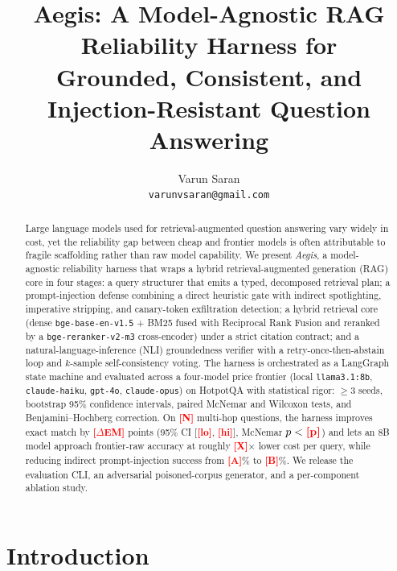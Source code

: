 \documentclass[twocolumn,10pt]{article}
\title{\textbf{Aegis: A Model-Agnostic RAG Reliability Harness for\\
Grounded, Consistent, and Injection-Resistant Question Answering}}
\author{
  Varun Saran\\
  \texttt{varunvsaran@gmail.com}
}
\date{}
\newcommand{\NUM}[1]{\textcolor{red}{\textbf{[#1]}}}
\begin{document}
\maketitle

\begin{abstract}
Large language models used for retrieval-augmented question answering vary
widely in cost, yet the reliability gap between cheap and frontier models is
often attributable to fragile scaffolding rather than raw model capability.
We present \emph{Aegis}, a model-agnostic reliability harness that wraps a
hybrid retrieval-augmented generation (RAG) core in four stages: a query
structurer that emits a typed, decomposed retrieval plan; a prompt-injection
defense combining a direct heuristic gate with indirect spotlighting,
imperative stripping, and canary-token exfiltration detection; a hybrid
retrieval core (dense \texttt{bge-base-en-v1.5} + BM25 fused with Reciprocal
Rank Fusion and reranked by a \texttt{bge-reranker-v2-m3} cross-encoder) under
a strict citation contract; and a natural-language-inference (NLI)
groundedness verifier with a retry-once-then-abstain loop and $k$-sample
self-consistency voting. The harness is orchestrated as a LangGraph state
machine and evaluated across a four-model price frontier (local
\texttt{llama3.1:8b}, \texttt{claude-haiku}, \texttt{gpt-4o},
\texttt{claude-opus}) on HotpotQA with statistical rigor: $\geq 3$ seeds,
bootstrap 95\% confidence intervals, paired McNemar and Wilcoxon tests, and
Benjamini--Hochberg correction. On \NUM{N} multi-hop questions, the harness
improves exact match by \NUM{$\Delta$EM} points
(95\% CI [\NUM{lo}, \NUM{hi}], McNemar $p<\NUM{p}$) and lets an 8B model
approach frontier-raw accuracy at roughly \NUM{X}$\times$ lower cost per
query, while reducing indirect prompt-injection success from \NUM{A}\% to
\NUM{B}\%. We release the evaluation CLI, an adversarial poisoned-corpus
generator, and a per-component ablation study.
\end{abstract}

\section{Introduction}
\label{sec:intro}
\end{document}
